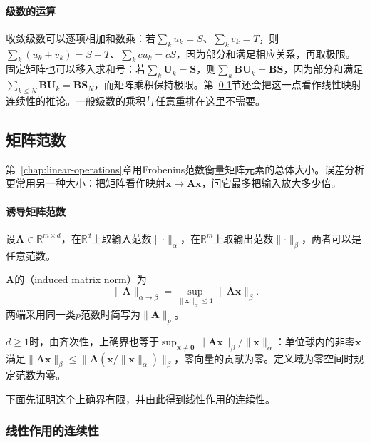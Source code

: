 \paragraph{级数的运算}
收敛级数可以逐项相加和数乘：若$\sum_ku_k=S$、$\sum_kv_k=T$，则$\sum_k(u_k+v_k)=S+T$、$\sum_kcu_k=cS$，因为部分和满足相应关系，再取极限。固定矩阵也可以移入求和号：若$\sum_k\bm U_k=\bm S$，则$\sum_k\bm B\bm U_k=\bm B\bm S$，因为部分和满足$\sum_{k\leq N}\bm B\bm U_k=\bm B\bm S_N$，而矩阵乘积保持极限。第~\ref{sec:ls-matrix-norms}节还会把这一点看作线性映射连续性的推论。一般级数的乘积与任意重排在这里不需要。

\subsection{矩阵范数}
\label{sec:ls-matrix-norms}
\label{sec:ch06-map-comparison}
\label{sec:matrix-analysis-norms-effective-rank}
\label{sec:multivariable-operator-norm}

第~\ref{chap:linear-operations}章用Frobenius范数衡量矩阵元素的总体大小。误差分析更常用另一种大小：把矩阵看作映射$\bm x\mapsto\bm A\bm x$，问它最多把输入放大多少倍。

\paragraph{诱导矩阵范数}
设$\bm A\in\mathbb R^{m\times d}$，在$\mathbb R^d$上取输入范数$\lVert\cdot\rVert_\alpha$，在$\mathbb R^m$上取输出范数$\lVert\cdot\rVert_\beta$，两者可以是任意范数。
\begin{definition}[由向量范数诱导的矩阵范数]
\label{def:matrix-analysis-induced-norm}
$\bm A$的（induced matrix norm）为
\[
 \lVert\bm A\rVert_{\alpha\to\beta}
 =\sup_{\lVert\bm x\rVert_\alpha\leq1}\lVert\bm A\bm x\rVert_\beta .
\]
两端采用同一类$p$范数时简写为$\lVert\bm A\rVert_p$。
\end{definition}
$d\geq1$时，由齐次性，上确界也等于$\sup_{\bm x\neq\bm0}\lVert\bm A\bm x\rVert_\beta/\lVert\bm x\rVert_\alpha$：单位球内的非零$\bm x$满足$\lVert\bm A\bm x\rVert_\beta\leq\lVert\bm A(\bm x/\lVert\bm x\rVert_\alpha)\rVert_\beta$，零向量的贡献为零。定义域为零空间时规定范数为零。

下面先证明这个上确界有限，并由此得到线性作用的连续性。

\subsubsection{线性作用的连续性}
\label{sec:ls-linear-action-continuity}

